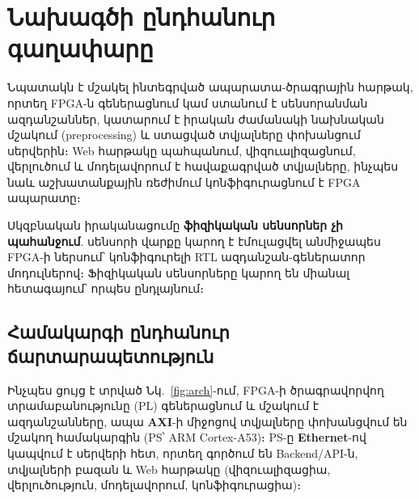 \chapter{Նախագծի ընդհանուր գաղափարը}

Նպատակն է մշակել ինտեգրված ապարատա-ծրագրային հարթակ, որտեղ FPGA-ն գեներացնում կամ
ստանում է սենսորանման ազդանշաններ, կատարում է իրական ժամանակի նախնական մշակում
(preprocessing) և ստացված տվյալները փոխանցում սերվերին։ Web հարթակը պահպանում,
վիզուալիզացնում, վերլուծում և մոդելավորում է հավաքագրված տվյալները, ինչպես նաև
աշխատանքային ռեժիմում կոնֆիգուրացնում է FPGA ապարատը։


Սկզբնական իրականացումը \textbf{ֆիզիկական սենսորներ չի պահանջում}. սենսորի վարքը
կարող է էմուլացվել անմիջապես FPGA-ի ներսում՝ կոնֆիգուրելի RTL ազդանշան-գեներատոր
մոդուլներով։ Ֆիզիկական սենսորները կարող են միանալ հետագայում՝ որպես ընդլայնում։

\section{Համակարգի ընդհանուր ճարտարապետություն}


Ինչպես ցույց է տրված Նկ.~\ref{fig:arch}-ում, FPGA-ի ծրագրավորվող տրամաբանությունը
(PL) գեներացնում և մշակում է ազդանշանները, ապա \textbf{AXI}-ի միջոցով տվյալները
փոխանցվում են մշակող համակարգին (PS՝ ARM Cortex-A53)։ PS-ը \textbf{Ethernet}-ով
կապվում է սերվերի հետ, որտեղ գործում են Backend/API-ն, տվյալների բազան և Web
հարթակը (վիզուալիզացիա, վերլուծություն, մոդելավորում, կոնֆիգուրացիա)։
